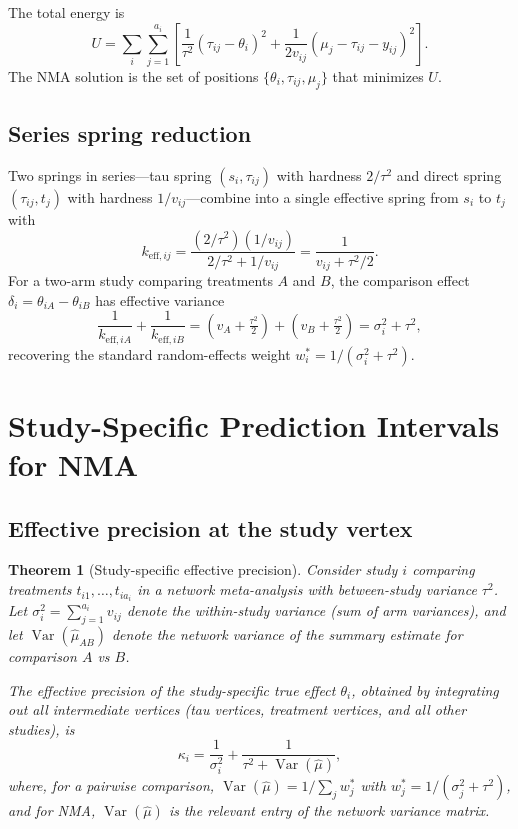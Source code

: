 \documentclass[12pt]{article}
\newcommand{\Var}{\operatorname{Var}}
\newtheorem{theorem}{Theorem}
\begin{document}
The total energy is
\begin{equation}\label{eq:energy}
  U = \sum_{i} \sum_{j=1}^{a_i}
    \left[
      \frac{1}{\tau^2}(\tau_{ij} - \theta_i)^2
      + \frac{1}{2v_{ij}}(\mu_j - \tau_{ij} - y_{ij})^2
    \right].
\end{equation}
The NMA solution is the set of positions $\{\theta_i, \tau_{ij}, \mu_j\}$
that minimizes $U$.

\subsection{Series spring reduction}

Two springs in series---tau spring $(s_i, \tau_{ij})$ with hardness
$2/\tau^2$ and direct spring $(\tau_{ij}, t_j)$ with hardness
$1/v_{ij}$---combine into a single effective spring from $s_i$ to $t_j$
with
\begin{equation}\label{eq:series}
  k_{\mathrm{eff},ij}
    = \frac{(2/\tau^2)(1/v_{ij})}{2/\tau^2 + 1/v_{ij}}
    = \frac{1}{v_{ij} + \tau^2/2}.
\end{equation}
For a two-arm study comparing treatments $A$ and $B$, the comparison
effect $\delta_i = \theta_{iA} - \theta_{iB}$ has effective variance
\begin{equation}
  \frac{1}{k_{\mathrm{eff},iA}} + \frac{1}{k_{\mathrm{eff},iB}}
    = (v_A + \tfrac{\tau^2}{2}) + (v_B + \tfrac{\tau^2}{2})
    = \sigma_i^2 + \tau^2,
\end{equation}
recovering the standard random-effects weight $w_i^* = 1/(\sigma_i^2 + \tau^2)$.


\section{Study-Specific Prediction Intervals for NMA}

\subsection{Effective precision at the study vertex}

\begin{theorem}[Study-specific effective precision]\label{thm:keff}
Consider study $i$ comparing treatments $t_{i1}, \ldots, t_{ia_i}$
in a network meta-analysis with between-study variance $\tau^2$.
Let $\sigma_i^2 = \sum_{j=1}^{a_i} v_{ij}$ denote the within-study
variance (sum of arm variances), and let
$\Var(\hat\mu_{AB})$ denote the network variance of the summary
estimate for comparison $A$ vs $B$.

The effective precision of the study-specific true effect $\theta_i$,
obtained by integrating out all intermediate vertices (tau vertices,
treatment vertices, and all other studies), is
\begin{equation}\label{eq:keff}
  \kappa_i = \frac{1}{\sigma_i^2}
           + \frac{1}{\tau^2 + \Var(\hat\mu)},
\end{equation}
where, for a pairwise comparison, $\Var(\hat\mu) = 1/\sum_j w_j^*$ with
$w_j^* = 1/(\sigma_j^2 + \tau^2)$, and for NMA,
$\Var(\hat\mu)$ is the relevant entry of the network variance matrix.
\end{theorem}
\end{document}
